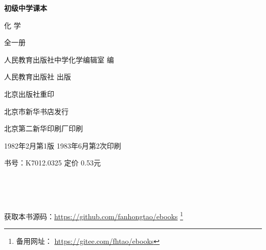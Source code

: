 \begin{titlepage}
    \begin{center}
        \vspace*{3cm}

        {\Large \textbf{初级中学课本} }

        \vspace{1cm}

        {\Huge 化 \qquad 学}

        \vspace{1.5cm}

        {\Large 全一册}

        \vspace{1cm}

        {\Large 人民教育出版社中学化学编辑室 \quad 编}

        \vfill

        人民教育出版社 出版

        北京出版社重印

        北京市新华书店发行

        北京第二新华印刷厂印刷

        1982年2月第1版  \qquad 1983年6月第2次印刷

        书号：K7012.0325 \quad 定价 0.53元

        \,

        \,

        获取本书源码：\url{https://github.com/fanhongtao/ebooks} \footnote{备用网址： \url{https://gitee.com/fhtao/ebooks} }
    \end{center}

    \newpage


\end{titlepage}
